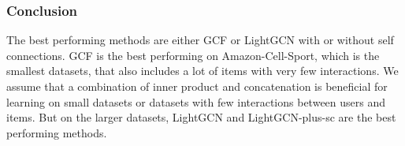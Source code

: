 \subsubsection{Conclusion}
The best performing methods are either GCF or LightGCN with or without self connections.
GCF is the best performing on Amazon-Cell-Sport, which is the smallest datasets, that also includes a lot of items with very few interactions.
We assume that a combination of inner product and concatenation is beneficial for learning on small datasets or datasets with few interactions between users and items.
But on the larger datasets, LightGCN and LightGCN-plus-sc are the best performing methods.
